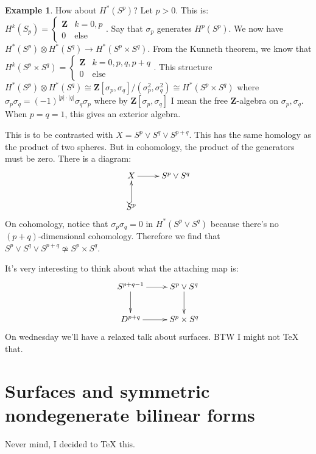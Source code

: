 \documentclass{amsart}
\theoremstyle{theorem}
\theoremstyle{definition}
\newtheorem{example}[theorem]{Example}
\newcommand{\Z}{\mathbf Z}
\begin{document}
\begin{example}
How about $ H^\ast(S^p)$? Let $p>0$. This is: $ H^k(S_p) = \begin{cases}\Z & k=0,p\\ 0 & \text{else}\end{cases}$. Say that $\sigma_p$ generates $ H^p(S^p)$. We now have $ H^\ast(S^p)\otimes H^\ast(S^q)\to H^\ast(S^p\times S^q)$. From the Kunneth theorem, we know that $ H^k(S^p\times S^q)=\begin{cases}\Z & k=0,p,q,p+q\\ 0 & \text{else}\end{cases}$. This structure $ H^\ast(S^p)\otimes H^\ast(S^q)\cong\Z[\sigma_p,\sigma_q]/(\sigma_p^2,\sigma_q^2)\cong H^\ast(S^p\times S^q)$ where $\sigma_p\sigma_q=(-1)^{|p|\cdot|q|}\sigma_q\sigma_p$ where by $\Z[\sigma_p,\sigma_q]$ I mean the free $\Z$-algebra on $\sigma_p,\sigma_q$. When $p=q=1$, this gives an exterior algebra.
\end{example}
This is to be contrasted with $X=S^p\vee S^q\vee S^{p+q}$. This has the same homology as the product of two spheres. But in cohomology, the product of the generators must be zero. There is a diagram:
\begin{equation*}
\xymatrix{
	X\ar[r] & S^p\vee S^q\\
	S^p\ar@{^(->}[u]
}
\end{equation*}
On cohomology, notice that $\sigma_p\sigma_q=0$ in $ H^\ast(S^p\vee S^q)$ because there's no $(p+q)$-dimensional cohomology. Therefore we find that $S^p\vee S^q\vee S^{p+q}\not\simeq S^p\times S^q$.

It's very interesting to think about what the attaching map is:
\begin{equation*}
\xymatrix{
	S^{p+q-1}\ar[r]\ar[d] & S^p\vee S^q\ar[d]\\
	D^{p+q}\ar[r] & S^p\times S^q
}
\end{equation*}
On wednesday we'll have a relaxed talk about surfaces. BTW I might not TeX that.
\section{Surfaces and symmetric nondegenerate bilinear forms}
Never mind, I decided to TeX this.
\end{document}
